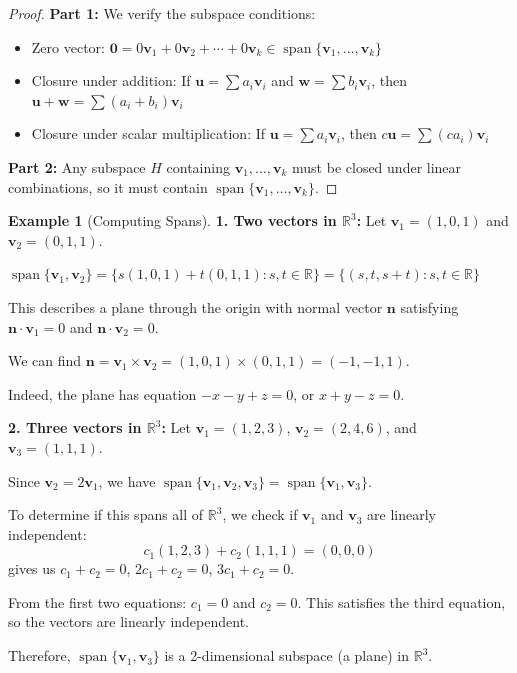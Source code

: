 \documentclass[12pt]{article}
\numberwithin{equation}{section}
\newcommand{\vect}[1]{\boldsymbol{#1}}   %
\newcommand{\Span}{\operatorname{span}}
\theoremstyle{plain}
\theoremstyle{definition}
\newtheorem{example}[theorem]{Example}
\theoremstyle{remark}
\begin{document}
\begin{proof}
\textbf{Part 1:} We verify the subspace conditions:
\begin{itemize}
\item Zero vector: $\vect{0} = 0\vect{v}_1 + 0\vect{v}_2 + \cdots + 0\vect{v}_k \in \Span\{\vect{v}_1, \ldots, \vect{v}_k\}$
\item Closure under addition: If $\vect{u} = \sum a_i\vect{v}_i$ and $\vect{w} = \sum b_i\vect{v}_i$, then $\vect{u} + \vect{w} = \sum (a_i + b_i)\vect{v}_i$
\item Closure under scalar multiplication: If $\vect{u} = \sum a_i\vect{v}_i$, then $c\vect{u} = \sum (ca_i)\vect{v}_i$
\end{itemize}

\textbf{Part 2:} Any subspace $H$ containing $\vect{v}_1, \ldots, \vect{v}_k$ must be closed under linear combinations, so it must contain $\Span\{\vect{v}_1, \ldots, \vect{v}_k\}$.
\end{proof}

\begin{example}[Computing Spans]
\textbf{1. Two vectors in $\mathbb{R}^3$:}
Let $\vect{v}_1 = (1, 0, 1)$ and $\vect{v}_2 = (0, 1, 1)$.

$\Span\{\vect{v}_1, \vect{v}_2\} = \{s(1, 0, 1) + t(0, 1, 1) : s, t \in \mathbb{R}\} = \{(s, t, s + t) : s, t \in \mathbb{R}\}$

This describes a plane through the origin with normal vector $\vect{n}$ satisfying $\vect{n} \cdot \vect{v}_1 = 0$ and $\vect{n} \cdot \vect{v}_2 = 0$.

We can find $\vect{n} = \vect{v}_1 \times \vect{v}_2 = (1, 0, 1) \times (0, 1, 1) = (-1, -1, 1)$.

Indeed, the plane has equation $-x - y + z = 0$, or $x + y - z = 0$.

\textbf{2. Three vectors in $\mathbb{R}^3$:}
Let $\vect{v}_1 = (1, 2, 3)$, $\vect{v}_2 = (2, 4, 6)$, and $\vect{v}_3 = (1, 1, 1)$.

Since $\vect{v}_2 = 2\vect{v}_1$, we have $\Span\{\vect{v}_1, \vect{v}_2, \vect{v}_3\} = \Span\{\vect{v}_1, \vect{v}_3\}$.

To determine if this spans all of $\mathbb{R}^3$, we check if $\vect{v}_1$ and $\vect{v}_3$ are linearly independent:
$$c_1(1, 2, 3) + c_2(1, 1, 1) = (0, 0, 0)$$
gives us $c_1 + c_2 = 0$, $2c_1 + c_2 = 0$, $3c_1 + c_2 = 0$.

From the first two equations: $c_1 = 0$ and $c_2 = 0$. This satisfies the third equation, so the vectors are linearly independent.

Therefore, $\Span\{\vect{v}_1, \vect{v}_3\}$ is a 2-dimensional subspace (a plane) in $\mathbb{R}^3$.
\end{example}
\end{document}
